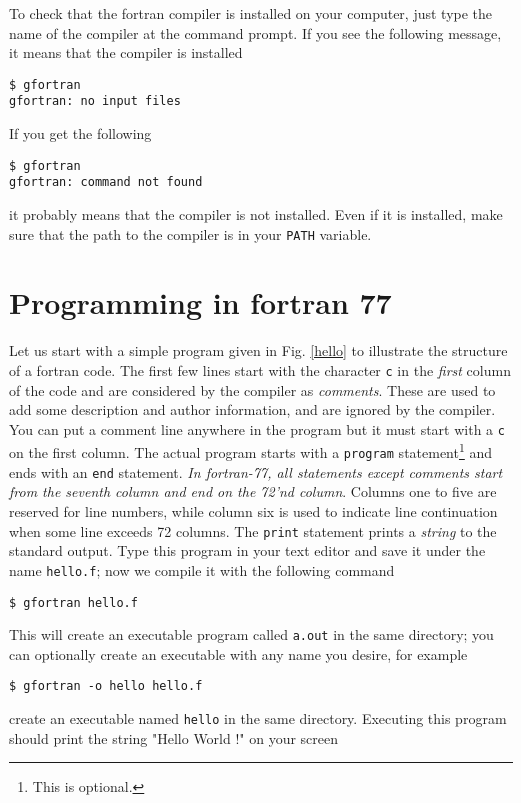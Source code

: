 \documentclass[11pt,oneside]{amsart}
\begin{document}
To check that the fortran compiler is installed on your computer, just type the name of the compiler at the command prompt. If you see the following message, it means that the compiler is installed

\begin{verbatim}
$ gfortran
gfortran: no input files
\end{verbatim}
If you get the following
\begin{verbatim}
$ gfortran
gfortran: command not found
\end{verbatim}
it probably means that the compiler is not installed. Even if it is installed, make sure that the path to the compiler is in your {\tt PATH} variable.

\section{Programming in fortran 77}

Let us start with a simple program given in Fig. \ref{hello} to illustrate the structure of a fortran code. The first few lines start with the character {\tt c} in the {\em first} column of the code and are considered by the compiler as {\em comments}. These are used to add some description and author information, and are ignored by the compiler.  You can put a comment line anywhere in the program but it must start with a {\tt c} on the first column. The actual program starts with a {\tt program} statement\footnote{This is optional.} and ends with an {\tt end} statement. {\em In fortran-77, all statements except comments start from the seventh column and end on the 72'nd column}. Columns one to five are reserved for line numbers, while column six is used to indicate line continuation when some line exceeds 72 columns. The {\tt print} statement prints a {\em string} to the standard output. Type this program in your text editor and save it under the name {\tt hello.f}; now we compile it with the following command

\begin{verbatim}
$ gfortran hello.f
\end{verbatim}
This will create an executable program called {\tt a.out} in the same directory; you can optionally create an executable with any name you desire, for example

\begin{verbatim}
$ gfortran -o hello hello.f
\end{verbatim}
create an executable named {\tt hello} in the same directory. Executing this program should print the string "Hello World !" on your screen
\end{document}
